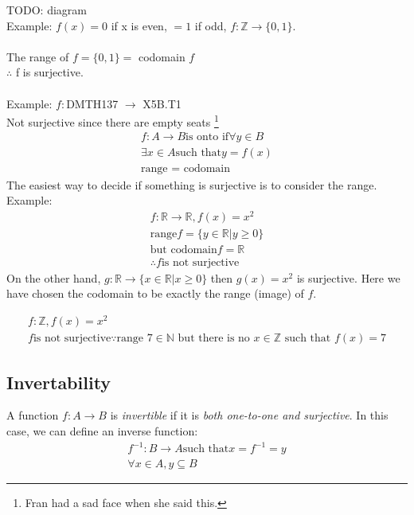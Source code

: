 TODO: diagram \\
Example: $f(x) = 0$ if x is even, $=1$ if odd, $f: \mathbb{Z} \to \{0,1\}$. \\
\\
The range of $f = \{0,1\} = $ codomain $f$ \\
$\therefore$ f is surjective. \\
\\
Example: $f:$DMTH137 $\to$ X5B.T1 \\
Not surjective since there are empty seats \footnote{Fran had a sad face when she said this.}
\begin{align}
  f: A \to B \text{is onto if} \forall y \in B \\
  \exists x \in A \text{such that} y = f(x) \\
  \text{range = codomain}
\end{align}
The easiest way to decide if something is surjective is to consider the range.
Example:
\begin{align}
  f: \mathbb{R} \to \mathbb{R}, f(x) = x^2 \\
  \text{range} f = \{ y \in \mathbb{R} | y \geq 0 \} \\
  \text{but codomain} f = \mathbb{R} \\
  \therefore f \text{is not surjective}
\end{align}
On the other hand, $g: \mathbb{R} \to \{x \in \mathbb{R} | x \geq 0 \}$ then $g(x) = x^2$
is surjective. Here we have chosen the codomain to be exactly the range (image) of $f$.

\begin{align}
  f: \mathbb{Z}, f(x) = x^2 \\
  f \text{is not surjective} \because \text{range $7 \in \mathbb{N}$ but there is no $x \in \mathbb{Z}$ such that $f(x) = 7$}
\end{align}

\subsection{Invertability}
A function $f: A \to B$ is \emph{invertible} if it is \emph{both one-to-one and
surjective}. In this case, we can define an inverse function:
\begin{align}
  f^{-1} : B \to A \text{such that} x = f^{-1} = y \\
  \forall x \in A, y \subseteq B
\end{align}

